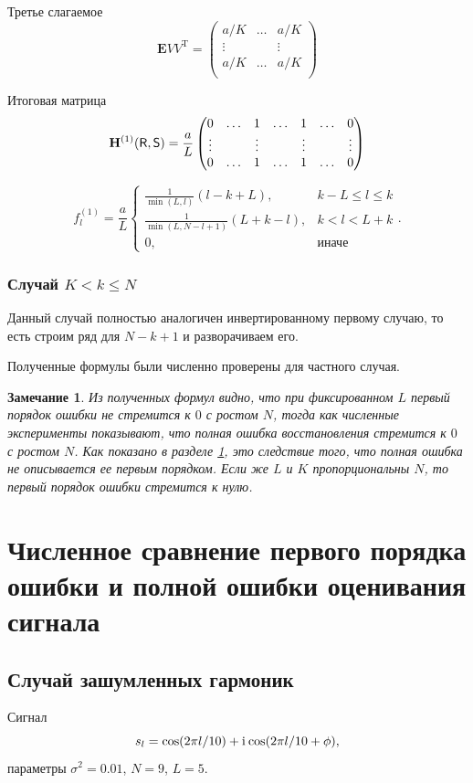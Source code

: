 \documentclass[specialist,
               substylefile = spbu.rtx,
               subf,href,colorlinks=true, 12pt]{disser}
\newtheorem{remark}{Замечание}
\begin{document}
Третье слагаемое
$$\mathbf{E} V V^{\mathrm{T}} = \begin{pmatrix}
	a/K &  \ldots & a/K\\
	\vdots & & \vdots\\
	a/K &  \ldots & a/K\\
\end{pmatrix}$$

Итоговая матрица
$$\mathbf{H}^{(1)}(\textsf{R}, \textsf{S}) = \frac{a}{L}\begin{pmatrix}
	0 & \ldots & 1 & \ldots & 1 & \ldots & 0\\
	\vdots & & \vdots & & \vdots & & \vdots\\
	0 & \ldots & 1 & \ldots & 1 & \ldots & 0
\end{pmatrix}$$

$$f^{(1)}_l = \frac{a}{{L}}
\begin{cases}
	\frac{1}{\min(L, l)}(l - k + L), & \text{$k - L \leq l \leq k$}\\
	\frac{1}{\min(L, N - l + 1)}(L + k - l), & \text{$k < l < L + k$}\\
	0, & \text{иначе}
\end{cases}.$$


\subsubsection{Случай $K < k \leq N$}
Данный случай полностью аналогичен инвертированному первому случаю, то есть строим ряд для $N - k + 1$ и разворачиваем его.

\vspace{1em}
Полученные формулы были численно проверены для частного случая.

\begin{remark}
	Из полученных формул видно, что при фиксированном $L$ первый порядок ошибки не стремится к $0$ с ростом $N$, тогда как численные эксперименты показывают, что полная ошибка восстановления стремится к $0$ с ростом $N$. Как показано в разделе \ref{sec:results}, это следствие того, что полная ошибка не описывается ее первым порядком. Если же $L$ и $K$ пропорциональны $N$, то первый порядок ошибки стремится к нулю.
\end{remark}


\section{Численное сравнение первого порядка ошибки и полной ошибки оценивания сигнала}
\label{sec:results}
\subsection{Случай зашумленных гармоник}
Сигнал
$$s_l = \cos(2 \pi l / 10) + \mathrm{i}\mkern1mu\cos(2 \pi l / 10 + \phi),$$ 
параметры $\sigma^2 = 0.01$, $N = 9$, $L = 5$. 
\end{document}
